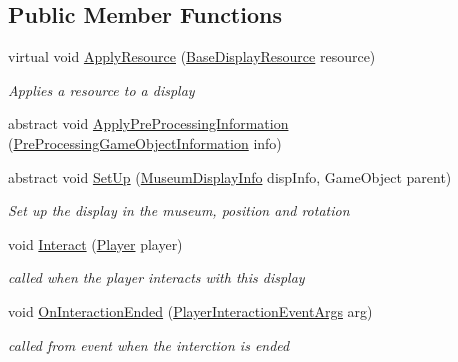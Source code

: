 \subsection*{Public Member Functions}
\begin{DoxyCompactItemize}
\item 
virtual void \mbox{\hyperlink{class_display_a811157ddb42ae4d72f690457a08711d3}{Apply\+Resource}} (\mbox{\hyperlink{class_base_display_resource}{Base\+Display\+Resource}} resource)
\begin{DoxyCompactList}\small\item\em Applies a resource to a display \end{DoxyCompactList}\item 
abstract void \mbox{\hyperlink{class_display_ab9cd24c11c43dd87bc50e85a8e9e4c31}{Apply\+Pre\+Processing\+Information}} (\mbox{\hyperlink{class_pre_processing_game_object_information}{Pre\+Processing\+Game\+Object\+Information}} info)
\item 
abstract void \mbox{\hyperlink{class_display_a57325251fbeac943cd48520e50f0bec4}{Set\+Up}} (\mbox{\hyperlink{class_museum_display_info}{Museum\+Display\+Info}} disp\+Info, Game\+Object parent)
\begin{DoxyCompactList}\small\item\em Set up the display in the museum, position and rotation \end{DoxyCompactList}\item 
void \mbox{\hyperlink{class_display_a43fc2a6f19bbf2f1bdb676392b37e921}{Interact}} (\mbox{\hyperlink{class_player}{Player}} player)
\begin{DoxyCompactList}\small\item\em called when the player interacts with this display \end{DoxyCompactList}\item 
void \mbox{\hyperlink{class_display_a29f45efdf15e97219d2c8a614d699da8}{On\+Interaction\+Ended}} (\mbox{\hyperlink{class_player_interaction_event_args}{Player\+Interaction\+Event\+Args}} arg)
\begin{DoxyCompactList}\small\item\em called from event when the interction is ended \end{DoxyCompactList}\end{DoxyCompactItemize}
